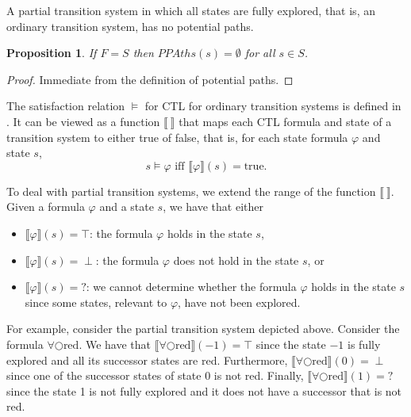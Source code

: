 \documentclass[12pt]{article}
\newcommand{\nxt}{\bigcirc}
\newtheorem{proposition}{Proposition}
\theoremstyle{definition}
\newcommand{\satisfaction}[1]{\llbracket #1 \rrbracket}
\begin{document}
A partial transition system in which all states are fully explored, that is, an ordinary transition system, has no potential paths.

\begin{proposition}
\label{proposition:no-potential-paths}
If $F= S$ then $\mathit{PPAths}(s) = \emptyset$ for all $s \in S$.
\end{proposition}
\begin{proof}
Immediate from the definition of potential paths.
\end{proof}

\color{black}
The satisfaction relation $\models$ for CTL for ordinary transition systems is defined in \cite[Definition~6.4]{BK08}.  It can be viewed as a function $\satisfaction{\ }$ that maps each CTL formula and state of a transition system to either true of false, that is, for each state formula $\varphi$ and state $s$,
\[
s \models \varphi \mbox{ iff } \satisfaction{\varphi}(s) = \mbox{true}.
\]

To deal with partial transition systems, we extend the range of the function $\satisfaction{\ }$.  Given a formula $\varphi$ and a state $s$, we have that either
\begin{itemize}
\item 
$\satisfaction{\varphi}(s) = \top$: the formula $\varphi$ holds in the state $s$,
\item
$\satisfaction{\varphi}(s) = \perp$: the formula $\varphi$ does not hold in the state $s$, or
\item
$\satisfaction{\varphi}(s) = \mathord{?}$: we cannot determine whether the formula $\varphi$ holds in the state $s$ since some states, relevant to $\varphi$,  have not been explored.
\end{itemize}

For example, consider the partial transition system depicted above.  Consider the formula $\forall \nxt \mbox{red}$.  We have that $\satisfaction{\forall \nxt \mbox{red}}(-1) = \top$ since the state $-1$ is fully explored and all its successor states are red.  Furthermore, $\satisfaction{\forall \nxt \mbox{red}}(0) = \perp$ since one of the  successor states of state 0 is not red.  Finally, $\satisfaction{\forall \nxt \mbox{red}}(1) = \mathord{?}$ since the state 1 is not fully explored and it does not have a successor that is not red.
\end{document}
